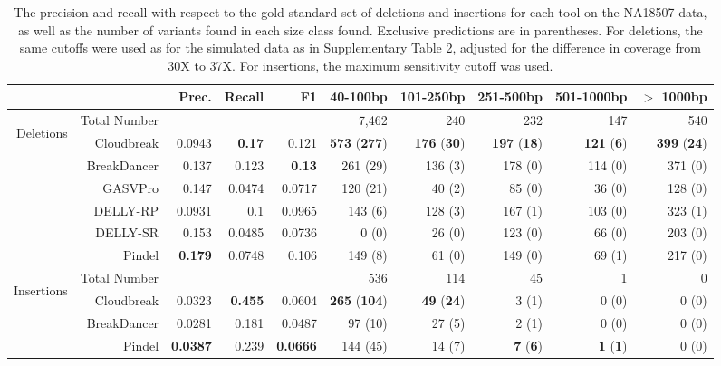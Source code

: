 \documentclass{bioinfo}
\newcommand{\todo}[1]{}
\begin{document}
\begin{table}
\begin{center}
\footnotesize
\begin{tabular}{r|rrrr|rrrrr}
  \cline{2-10}
&  & Prec. & Recall & F1 & 40-100bp & 101-250bp & 251-500bp & 501-1000bp & $>$ 1000bp \\ 
\hline
\multirow{6}{*}{\begin{sideways}Deletions\end{sideways}} & Total Number & & & & 7,462 & 240 & 232 & 147 & 540 \\
  \hline
\cline{2-10}
& Cloudbreak & 0.0943 & \textbf{0.17} & 0.121 & \textbf{573} (\textbf{277})  & \textbf{176} (\textbf{30}) &  \textbf{197} (\textbf{18}) & \textbf{121} (\textbf{6}) & \textbf{399} (\textbf{24}) \\ 
& BreakDancer & 0.137 & 0.123 &  \textbf{0.13} & 261 (29)  & 136 (3) &  178 (0) & 114 (0) & 371 (0) \\  
&  GASVPro & 0.147 & 0.0474 &  0.0717 & 120 (21)  & 40 (2) &  85 (0) & 36 (0) & 128 (0) \\ 
&  DELLY-RP & 0.0931 & 0.1 &  0.0965 & 143 (6)  & 128 (3) &  167 (1) & 103 (0) & 323 (1) \\ 
&  DELLY-SR & 0.153 & 0.0485 &  0.0736 & 0 (0)  & 26 (0) &  123 (0) & 66 (0) & 203 (0) \\ 
&  Pindel & \textbf{0.179} & 0.0748 &  0.106 & 149 (8)  & 61 (0) &  149 (0) & 69 (1) & 217 (0) \\ 
\hline
\multirow{4}{*}{\begin{sideways}Insertions\end{sideways}} & Total Number & & & & 536 & 114 & 45 & 1 & 0 \\
\cline{2-10}
& Cloudbreak & 0.0323 & \textbf{0.455} &  0.0604 & \textbf{265} (\textbf{104})  & \textbf{49} (\textbf{24}) &  3 (1) & 0 (0)  & 0 (0)  \\ 
& BreakDancer & 0.0281 & 0.181 &  0.0487 & 97 (10)  & 27 (5) &  2 (1) & 0 (0) & 0 (0) \\  
&  Pindel & \textbf{0.0387} & 0.239 &  \textbf{0.0666} & 144 (45)  & 14 (7) &  \textbf{7} (\textbf{6}) & \textbf{1} (\textbf{1}) &  0 (0) \\ 
\hline
\end{tabular}
\end{center}
\caption{The precision and recall with respect to the gold standard set of deletions and insertions for each tool on the NA18507 data, as well as the number of variants found in each size class found. Exclusive predictions are in parentheses. For deletions, the same cutoffs were used as for the simulated data as in Supplementary Table 2\todo{\ref{Schr2DeletionPredsFDR10}}, adjusted for the difference in coverage from 30X to 37X. For insertions, the maximum sensitivity cutoff was used.}
\label{NA18507DeletionAndInsertionPreds}
\end{table}
\end{document}
